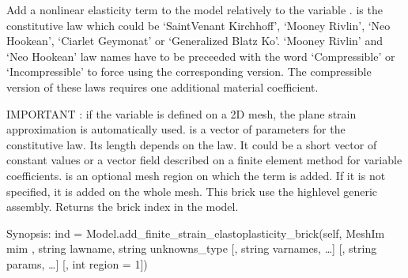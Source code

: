 \documentclass[a4paper,11pt,english]{sphinxmanual}
\begin{document}
\begin{fulllineitems}
\begin{fulllineitems}
\label{\detokenize{python/cmdref_Model:getfem.Model.add_finite_strain_elasticity_brick}}
Add a nonlinear elasticity term to the model relatively to the
variable .  is the constitutive law which
could be ‘SaintVenant Kirchhoff’, ‘Mooney Rivlin’, ‘Neo Hookean’,
‘Ciarlet Geymonat’ or ‘Generalized Blatz Ko’.
‘Mooney Rivlin’ and ‘Neo Hookean’ law names have to be preceeded with
the word ‘Compressible’ or ‘Incompressible’ to force using the
corresponding version.
The compressible version of these laws requires one additional material
coefficient.

IMPORTANT : if the variable is defined on a 2D mesh, the plane strain
approximation is automatically used.
 is a vector of parameters for the constitutive law. Its length
depends on the law. It could be a short vector of constant values or a
vector field described on a finite element method for variable
coefficients.  is an optional mesh region on which the term
is added. If it is not specified, it is added on the whole mesh.
This brick use the high\sphinxhyphen{}level generic assembly.
Returns the brick index in the model.

\end{fulllineitems}


\begin{fulllineitems}
\label{\detokenize{python/cmdref_Model:getfem.Model.add_finite_strain_elastoplasticity_brick}}
Synopsis: ind = Model.add\_finite\_strain\_elastoplasticity\_brick(self, MeshIm mim , string lawname, string unknowns\_type {[}, string varnames, …{]} {[}, string params, …{]} {[}, int region = \sphinxhyphen{}1{]})


\end{fulllineitems}
\end{fulllineitems}
\end{document}
